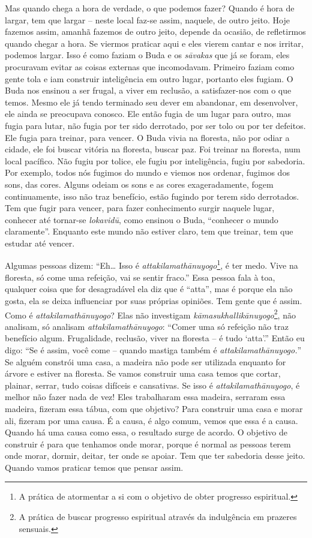 Mas quando chega a hora de verdade, o que podemos fazer? Quando é
hora de largar, tem que largar – neste local faz-se assim, naquele, de
outro jeito. Hoje fazemos assim, amanhã fazemos de outro jeito, depende
da ocasião, de refletirmos quando chegar a hora. Se viermos praticar
aqui e eles vierem cantar e nos irritar, podemos largar. Isso é como
faziam o Buda e os \textit{s\=avakas} que já se foram, eles procuravam
evitar as coisas externas que incomodavam. Primeiro faziam como gente
tola e iam construir inteligência em outro lugar, portanto eles fugiam.
O Buda nos ensinou a ser frugal, a viver em reclusão, a satisfazer-nos
com o que temos. Mesmo ele já tendo terminado seu dever em abandonar,
em desenvolver, ele ainda se preocupava conosco. Ele então fugia de um
lugar para outro, mas fugia para lutar, não fugia por ter sido
derrotado, por ser tolo ou por ter defeitos. Ele fugia para treinar,
para vencer. O Buda vivia na floresta, não por odiar a cidade, ele foi
buscar vitória na floresta, buscar paz. Foi treinar na floresta, num
local pacífico. Não fugiu por tolice, ele fugiu por inteligência, fugiu
por sabedoria. Por exemplo, todos nós fugimos do mundo e viemos nos
ordenar, fugimos dos sons, das cores. Alguns odeiam os sons e as cores
exageradamente, fogem continuamente, isso não traz benefício, estão
fugindo por terem sido derrotados. Tem que fugir para vencer, para
fazer conhecimento surgir naquele lugar, conhecer até tornar-se
\textit{lokavid\=u}, como ensinou o Buda, “conhecer o mundo
claramente”. Enquanto este mundo não estiver claro, tem que treinar,
tem que estudar até vencer. 

Algumas pessoas dizem: “Eh… Isso é
\textit{attakilamath\=anuyogo}\footnote{A prática de atormentar a si
com o objetivo de obter progresso espiritual.}, é ter medo. Vive na
floresta, só come uma refeição, vai se sentir fraco.” Essa pessoa fala
à toa, qualquer coisa que for desagradável ela diz que é “atta”, mas é
porque ela não gosta, ela se deixa influenciar por suas próprias
opiniões. Tem gente que é assim. Como é \textit{attakilamath\=anuyogo}?
Elas não investigam \textit{k\=amasukhallik\=anuyogo}\footnote{A
prática de buscar progresso espiritual através da indulgência em
prazeres sensuais.}, não analisam, só analisam
\textit{attakilamath\=anuyogo}: “Comer uma só refeição não traz
benefício algum. Frugalidade, reclusão, viver na floresta – é tudo
‘atta’.” Então eu digo: “Se é assim, você come – quando mastiga também
é \textit{attakilamath\=anuyogo.}” Se alguém constrói uma casa, a
madeira não pode ser utilizada enquanto for árvore e estiver na
floresta. Se vamos construir uma casa temos que cortar, plainar,
serrar, tudo coisas difíceis e cansativas. Se isso é
\textit{attakilamath\=anuyogo}, é melhor não fazer nada de vez! Eles
trabalharam essa madeira, serraram essa madeira, fizeram essa tábua,
com que objetivo? Para construir uma casa e morar ali, fizeram por uma
causa. É a causa, é algo comum, vemos que essa é a causa. Quando há uma
causa como essa, o resultado surge de acordo. O objetivo de construir é
para que tenhamos onde morar, porque é normal as pessoas terem onde
morar, dormir, deitar, ter onde se apoiar. Tem que ter sabedoria desse
jeito. Quando vamos praticar temos que pensar assim. 

